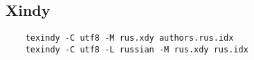  
 
 
 
 

\subsection{Xindy}
\label{sec:build.xindy}

\begin{Verbatim}
	texindy -C utf8 -M rus.xdy authors.rus.idx
	texindy -C utf8 -L russian -M rus.xdy rus.idx
\end{Verbatim}
